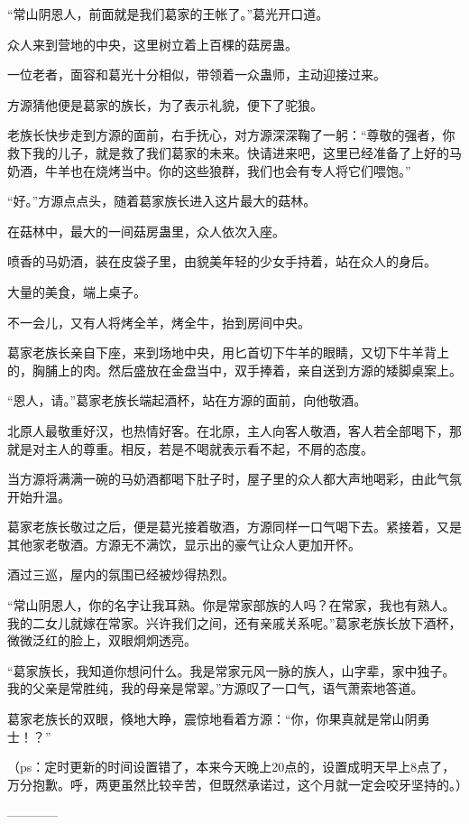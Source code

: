 \begin{this_body}
“常山阴恩人，前面就是我们葛家的王帐了。”葛光开口道。

众人来到营地的中央，这里树立着上百棵的菇房蛊。

一位老者，面容和葛光十分相似，带领着一众蛊师，主动迎接过来。

方源猜他便是葛家的族长，为了表示礼貌，便下了驼狼。

老族长快步走到方源的面前，右手抚心，对方源深深鞠了一躬：“尊敬的强者，你救下我的儿子，就是救了我们葛家的未来。快请进来吧，这里已经准备了上好的马奶酒，牛羊也在烧烤当中。你的这些狼群，我们也会有专人将它们喂饱。”

“好。”方源点点头，随着葛家族长进入这片最大的菇林。

在菇林中，最大的一间菇房蛊里，众人依次入座。

喷香的马奶酒，装在皮袋子里，由貌美年轻的少女手持着，站在众人的身后。

大量的美食，端上桌子。

不一会儿，又有人将烤全羊，烤全牛，抬到房间中央。

葛家老族长亲自下座，来到场地中央，用匕首切下牛羊的眼睛，又切下牛羊背上的，胸脯上的肉。然后盛放在金盘当中，双手捧着，亲自送到方源的矮脚桌案上。

“恩人，请。”葛家老族长端起酒杯，站在方源的面前，向他敬酒。

北原人最敬重好汉，也热情好客。在北原，主人向客人敬酒，客人若全部喝下，那就是对主人的尊重。相反，若是不喝就表示看不起，不屑的态度。

当方源将满满一碗的马奶酒都喝下肚子时，屋子里的众人都大声地喝彩，由此气氛开始升温。

葛家老族长敬过之后，便是葛光接着敬酒，方源同样一口气喝下去。紧接着，又是其他家老敬酒。方源无不满饮，显示出的豪气让众人更加开怀。

酒过三巡，屋内的氛围已经被炒得热烈。

“常山阴恩人，你的名字让我耳熟。你是常家部族的人吗？在常家，我也有熟人。我的二女儿就嫁在常家。兴许我们之间，还有亲戚关系呢。”葛家老族长放下酒杯，微微泛红的脸上，双眼炯炯透亮。

“葛家族长，我知道你想问什么。我是常家元风一脉的族人，山字辈，家中独子。我的父亲是常胜纯，我的母亲是常翠。”方源叹了一口气，语气萧索地答道。

葛家老族长的双眼，倏地大睁，震惊地看着方源：“你，你果真就是常山阴勇士！？”

（ps：定时更新的时间设置错了，本来今天晚上20点的，设置成明天早上8点了，万分抱歉。呼，两更虽然比较辛苦，但既然承诺过，这个月就一定会咬牙坚持的。）

------------

\end{this_body}

